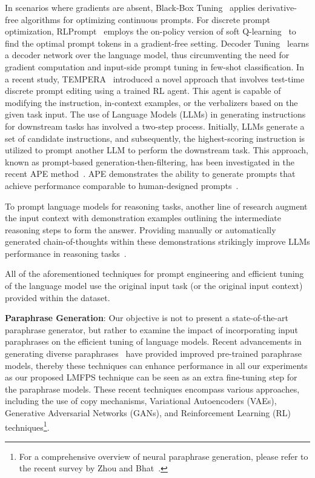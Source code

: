 \documentclass[11pt]{article}
\begin{document}
In scenarios where gradients are absent, Black-Box Tuning~\cite{DBLP:journals/corr/abs-2201-03514} applies derivative-free algorithms for optimizing continuous prompts. For discrete prompt optimization, RLPrompt~\cite{deng-etal-2022-rlprompt} employs the on-policy version of soft Q-learning~\cite{https://doi.org/10.48550/arxiv.2106.07704} to find the optimal prompt tokens in a gradient-free setting. Decoder Tuning~\cite{cui-etal-2023-decoder} learns a decoder network over the language model, thus circumventing the need for gradient computation and input-side prompt tuning in few-shot classification. In a recent study, TEMPERA~\cite{zhang2022tempera} introduced a novel approach that involves test-time discrete prompt editing using a trained RL agent. This agent is capable of modifying the instruction, in-context examples, or the verbalizers based on the given task input. The use of Language Models (LLMs) in generating instructions for downstream tasks has involved a two-step process. Initially, LLMs generate a set of candidate instructions, and subsequently, the highest-scoring instruction is utilized to prompt another LLM to perform the downstream task. This approach, known as prompt-based generation-then-filtering, has been investigated in the recent APE method~\cite{zhou2023large}. APE demonstrates the ability to generate prompts that achieve performance comparable to human-designed prompts~\cite{zhou2023large}.

To prompt language models for reasoning tasks, another line of research augment the input context with demonstration examples outlining the intermediate reasoning steps to form the answer. Providing manually or automatically generated chain-of-thoughts within these demonstrations strikingly improve LLMs performance in reasoning tasks~\cite{DBLP:journals/corr/abs-2201-11903, zhang2022automatic, NEURIPS2022_8bb0d291}.

All of the aforementioned techniques for prompt engineering and efficient tuning of the language model use the original input task (or the original input context) provided within the dataset.

\noindent
{\bf Paraphrase Generation}:
Our objective is not to present a state-of-the-art paraphrase generator, but rather to examine the impact of incorporating input paraphrases on the efficient tuning of language models. Recent advancements in generating diverse paraphrases~\cite{zhou-bhat-2021-paraphrase} have provided improved pre-trained paraphrase models, thereby these techniques can enhance performance in all our experiments as our proposed LMFPS technique can be seen as an extra fine-tuning step for the paraphrase models. These recent techniques encompass various approaches, including the use of copy mechanisms, Variational Autoencoders (VAEs), Generative Adversarial Networks (GANs), and Reinforcement Learning (RL) techniques\footnote{For a comprehensive overview of neural paraphrase generation, please refer to the recent survey by Zhou and Bhat~\cite{zhou-bhat-2021-paraphrase}.}.
\end{document}
